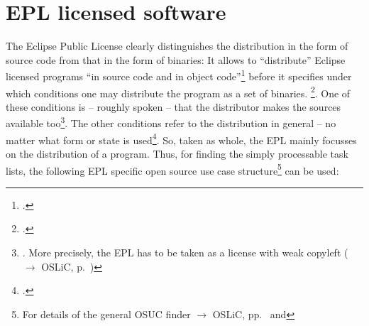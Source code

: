 %
%
%
%
%



\section{EPL licensed software}

The Eclipse Public License clearly distinguishes the distribution in the form of
source code from that in the form of binaries: It allows to \enquote{distribute}
Eclipse licensed programs \enquote{in source code and in object
code}\footcite[cf.][\nopage wp\ §3]{Epl10OsiLicense2005a} before it specifies
under which conditions one may distribute the program as a set of binaries.
\footcite[cf.][\nopage wp\ §3 top area]{Epl10OsiLicense2005a}. One of these
conditions is -- roughly spoken -- that the distributor makes the sources
available too\footnote{\cite[cf.][\nopage wp\ §3 mid
area]{Epl10OsiLicense2005a}. More precisely, the EPL has to be taken as a
license with weak copyleft ($\rightarrow$ OSLiC, p.\
\pageref{sec:ProtectingPowerOfEpl})}. The other conditions refer to the
distribution in general -- no matter what form or state is
used\footcite[cf.][\nopage wp\ §3 bottom area]{Epl10OsiLicense2005a}. So, taken
as whole, the EPL mainly focusses on the distribution of a program. Thus, for
finding the simply processable task lists, the following EPL specific open source
use case structure\footnote{For details of the general OSUC finder $\rightarrow$
OSLiC, pp.\ \pageref{OsucTokens} and \pageref{OsucDefinitionTree}} can be used:
 
